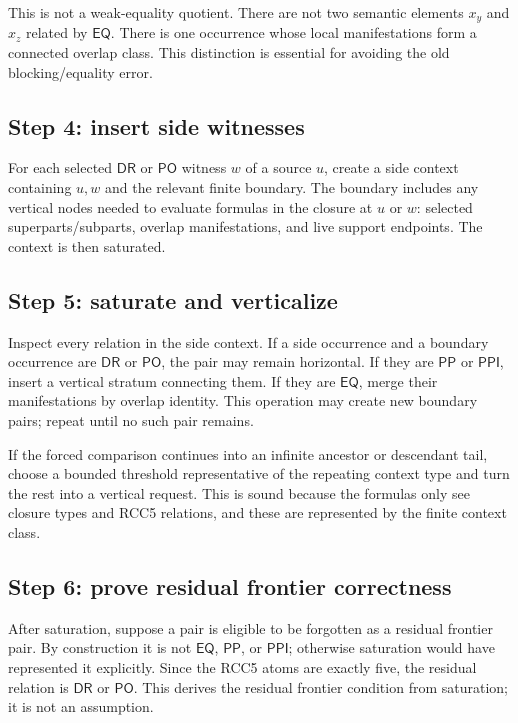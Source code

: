 \documentclass[11pt]{article}
\newcommand{\EQ}{\mathsf{EQ}}
\newcommand{\PP}{\mathsf{PP}}
\newcommand{\PPI}{\mathsf{PPI}}
\newcommand{\PO}{\mathsf{PO}}
\newcommand{\DR}{\mathsf{DR}}
\begin{document}
This is not a weak-equality quotient.  There are not two semantic elements $x_y$ and $x_z$ related by $\EQ$.  There is one occurrence whose local manifestations form a connected overlap class.  This distinction is essential for avoiding the old blocking/equality error.

\subsection{Step 4: insert side witnesses}

For each selected $\DR$ or $\PO$ witness $w$ of a source $u$, create a side context containing $u,w$ and the relevant finite boundary.  The boundary includes any vertical nodes needed to evaluate formulas in the closure at $u$ or $w$: selected superparts/subparts, overlap manifestations, and live support endpoints.  The context is then saturated.

\subsection{Step 5: saturate and verticalize}

Inspect every relation in the side context.  If a side occurrence and a boundary occurrence are $\DR$ or $\PO$, the pair may remain horizontal.  If they are $\PP$ or $\PPI$, insert a vertical stratum connecting them.  If they are $\EQ$, merge their manifestations by overlap identity.  This operation may create new boundary pairs; repeat until no such pair remains.

If the forced comparison continues into an infinite ancestor or descendant tail, choose a bounded threshold representative of the repeating context type and turn the rest into a vertical request.  This is sound because the formulas only see closure types and RCC5 relations, and these are represented by the finite context class.

\subsection{Step 6: prove residual frontier correctness}

After saturation, suppose a pair is eligible to be forgotten as a residual frontier pair.  By construction it is not $\EQ$, $\PP$, or $\PPI$; otherwise saturation would have represented it explicitly.  Since the RCC5 atoms are exactly five, the residual relation is $\DR$ or $\PO$.  This derives the residual frontier condition from saturation; it is not an assumption.
\end{document}
